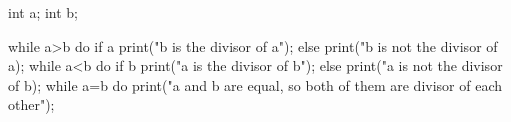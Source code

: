 int a;
int b;

while a>b do 
   if a%
     print("b is the divisor of a");
   else 
     print("b is not the divisor of a);
while a<b do
   if b%
     print("a is the divisor of b");
   else 
     print("a is not the divisor of b);
while a=b do
   print("a and b are equal, so both of them are divisor of each other");